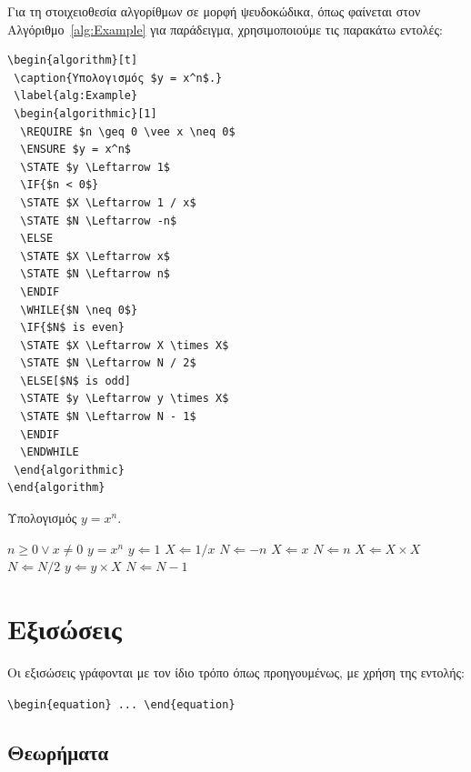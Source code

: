 Για τη στοιχειοθεσία αλγορίθμων σε μορφή ψευδοκώδικα, όπως φαίνεται στον Αλγόριθμο~\ref{alg:Example} για παράδειγμα, χρησιμοποιούμε τις παρακάτω εντολές:

\begin{verbatim}
\begin{algorithm}[t]
 \caption{Υπολογισμός $y = x^n$.}
 \label{alg:Example}
 \begin{algorithmic}[1]
  \REQUIRE $n \geq 0 \vee x \neq 0$
  \ENSURE $y = x^n$
  \STATE $y \Leftarrow 1$
  \IF{$n < 0$}
  \STATE $X \Leftarrow 1 / x$
  \STATE $N \Leftarrow -n$
  \ELSE
  \STATE $X \Leftarrow x$
  \STATE $N \Leftarrow n$
  \ENDIF
  \WHILE{$N \neq 0$}
  \IF{$N$ is even}
  \STATE $X \Leftarrow X \times X$
  \STATE $N \Leftarrow N / 2$
  \ELSE[$N$ is odd]
  \STATE $y \Leftarrow y \times X$
  \STATE $N \Leftarrow N - 1$
  \ENDIF
  \ENDWHILE
 \end{algorithmic}
\end{algorithm}
\end{verbatim}

\begin{algorithm}[t]
	\caption{Υπολογισμός $y = x^n$.}
	\label{alg:Example}
	\begin{algorithmic}[1]
		\REQUIRE $n \geq 0 \vee x \neq 0$
		\ENSURE $y = x^n$
		\STATE $y \Leftarrow 1$
		\STATE $X \Leftarrow 1 / x$
		\STATE $N \Leftarrow -n$
		\ELSE
		\STATE $X \Leftarrow x$
		\STATE $N \Leftarrow n$
		\ENDIF
		\STATE $X \Leftarrow X \times X$
		\STATE $N \Leftarrow N / 2$
		\ELSE[$N$ is odd]
		\STATE $y \Leftarrow y \times X$
		\STATE $N \Leftarrow N - 1$
		\ENDIF
		\ENDWHILE
	\end{algorithmic}
\end{algorithm}


\section{Εξισώσεις}
\label{sec:Equations}

Οι εξισώσεις γράφονται με τον ίδιο τρόπο όπως προηγουμένως, με
χρήση της εντολής:

\begin{center}\verb|\begin{equation} ... \end{equation}|\end{center}

\subsection{Θεωρήματα}
\label{subsec:Theorems}

